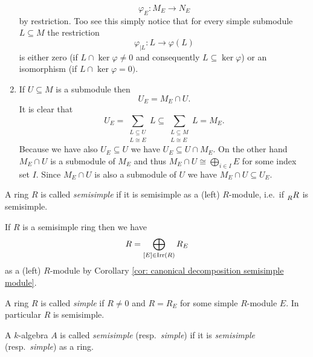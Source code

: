 \begin{rem}
\begin{enumerate}[label=\emph{\alph*)},leftmargin=*]
      \[
                \varphi_E
        \colon  M_E
        \to     N_E
      \]
      by restriction.
      Too see this simply notice that for every simple submodule $L \subseteq M$ the restriction
      \[
                \varphi_{|L}
        \colon  L
        \to     \varphi(L)
      \]
      is either zero (if $L \cap \ker \varphi \neq 0$ and consequently $L \subseteq \ker \varphi$) or an isomorphism (if $L \cap \ker \varphi = 0)$.
    \item
      If $U \subseteq M$ is a submodule then
      \[
          U_E
        = M_E \cap U.
      \]
      It is clear that
      \[
                  U_E
        =         \sum_{\substack{L \subseteq U \\ L \cong E}} L
        \subseteq \sum_{\substack{L \subseteq M \\ L \cong E}} L
        =         M_E.
      \]
      Because we have also $U_E \subseteq U$ we have $U_E \subseteq U \cap M_E$.
      On the other hand $M_E \cap U$ is a submodule of $M_E$ and thus $M_E \cap U \cong \bigoplus_{i \in I} E$ for some index set $I$.
      Since $M_E \cap U$ is also a submodule of $U$ we have $M_E \cap U \subseteq U_E$.
  \end{enumerate}
\end{rem}


\begin{defi}
  A ring $R$ is called \emph{semisimple} if it is semisimple as a (left) $R$-module, i.e.\ if $\prescript{}{R}{R}$ is semisimple.
\end{defi}


If $R$ is a semisimple ring then we have
\[
    R
  = \bigoplus_{[E] \in \operatorname{Irr}(R)} R_E
\]
as a (left) $R$-module by Corollary \ref{cor: canonical decomposition semisimple module}.


\begin{defi}
  A ring $R$ is called \emph{simple} if $R \neq 0$ and $R = R_E$ for some simple $R$-module $E$.
  In particular $R$ is semisimple.
\end{defi}


\begin{defi}
  A $k$-algebra $A$ is called \emph{semisimple} (resp.\ \emph{simple}) if it is \emph{semisimple} (resp.\ \emph{simple}) as a ring.
\end{defi}


